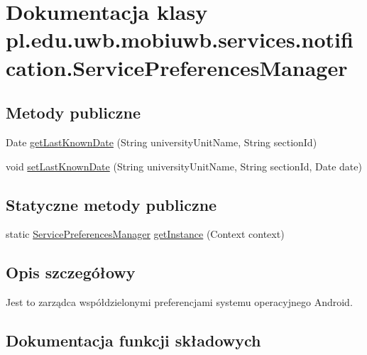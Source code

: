 \hypertarget{classpl_1_1edu_1_1uwb_1_1mobiuwb_1_1services_1_1notification_1_1_service_preferences_manager}{}\section{Dokumentacja klasy pl.\+edu.\+uwb.\+mobiuwb.\+services.\+notification.\+Service\+Preferences\+Manager}
\label{classpl_1_1edu_1_1uwb_1_1mobiuwb_1_1services_1_1notification_1_1_service_preferences_manager}
\subsection*{Metody publiczne}
\begin{DoxyCompactItemize}
\item 
Date \hyperlink{classpl_1_1edu_1_1uwb_1_1mobiuwb_1_1services_1_1notification_1_1_service_preferences_manager_a7849460b2fcbb87a344c2ae227562a9b}{get\+Last\+Known\+Date} (String university\+Unit\+Name, String section\+Id)
\item 
void \hyperlink{classpl_1_1edu_1_1uwb_1_1mobiuwb_1_1services_1_1notification_1_1_service_preferences_manager_a355aeec5e3f6aab43a0348d2765ced82}{set\+Last\+Known\+Date} (String university\+Unit\+Name, String section\+Id, Date date)
\end{DoxyCompactItemize}
\subsection*{Statyczne metody publiczne}
\begin{DoxyCompactItemize}
\item 
static \hyperlink{classpl_1_1edu_1_1uwb_1_1mobiuwb_1_1services_1_1notification_1_1_service_preferences_manager}{Service\+Preferences\+Manager} \hyperlink{classpl_1_1edu_1_1uwb_1_1mobiuwb_1_1services_1_1notification_1_1_service_preferences_manager_a47579688a30f1a8c66e60a51c4ae0e6a}{get\+Instance} (Context context)
\end{DoxyCompactItemize}


\subsection{Opis szczegółowy}
Jest to zarządca współdzielonymi preferencjami systemu operacyjnego Android. 

\subsection{Dokumentacja funkcji składowych}
\hypertarget{classpl_1_1edu_1_1uwb_1_1mobiuwb_1_1services_1_1notification_1_1_service_preferences_manager_a47579688a30f1a8c66e60a51c4ae0e6a}{}
